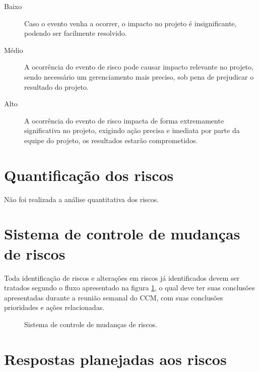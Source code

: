 \begin{description}
\item [Baixo] Caso o evento venha a ocorrer, o impacto no projeto é insignificante, podendo ser facilmente resolvido.
\item [Médio] A ocorrência do evento de risco pode causar impacto relevante no projeto, sendo necessário um gerenciamento mais preciso, sob pena de prejudicar o resultado do projeto.
\item [Alto] A ocorrência do evento de risco impacta de forma extremamente significativa no projeto, exigindo ação precisa e imediata por parte da equipe do projeto, os resultados estarão comprometidos.
\end{description}


\section{Quantificação dos riscos}

Não foi realizada a análise quantitativa dos riscos.

\section{Sistema de controle de mudanças de riscos}
\label{sec:risk-change-control-system}

Toda identificação de riscos e alterações em riscos já identificados devem ser tratados segundo o fluxo apresentado na figura \ref{fig:risk-change-control-system}, o qual deve ter suas conclusões apresentadas durante a reunião semanal do CCM, com suas conclusões prioridades e ações relacionadas.


\begin{figure}[h]
\centering
{}
\caption{Sistema de controle de mudanças de riscos.}
\label{fig:risk-change-control-system}
\end{figure}

\section{Respostas planejadas aos riscos}

